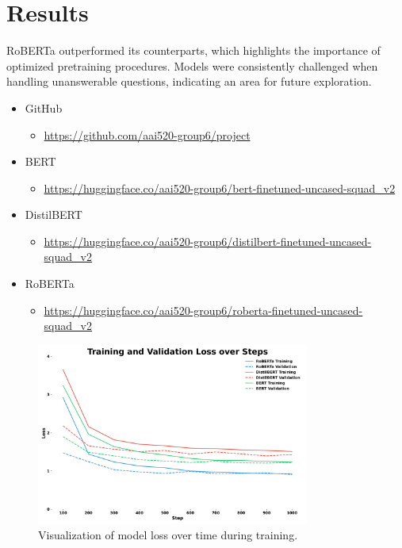 \documentclass[12pt]{extarticle}
\begin{document}
\section{Results}

RoBERTa outperformed its counterparts, which highlights the importance of optimized pretraining procedures. Models were consistently challenged when handling unanswerable questions, indicating an area for future exploration.

\begin{itemize}
    \item GitHub
    \begin{itemize}
        \item[] \href{https://github.com/aai520-group6/project}{https://github.com/aai520-group6/project}
    \end{itemize}
    \item BERT
    \begin{itemize}
        \item[] \href{https://huggingface.co/aai520-group6/bert-finetuned-uncased-squad_v2}{https://huggingface.co/aai520-group6/bert-finetuned-uncased-squad\_v2}
    \end{itemize}
    \item DistilBERT
    \begin{itemize}
        \item[] \href{https://huggingface.co/aai520-group6/distilbert-finetuned-uncased-squad_v2}{https://huggingface.co/aai520-group6/distilbert-finetuned-uncased-squad\_v2}
    \end{itemize}
    \item RoBERTa
    \begin{itemize}
        \item[] \href{https://huggingface.co/aai520-group6/roberta-finetuned-uncased-squad_v2}{https://huggingface.co/aai520-group6/roberta-finetuned-uncased-squad\_v2}
    \end{itemize}
\end{itemize}

\begin{figure}[h!]
    \centering
    \includegraphics[width=0.8\textwidth]{images/loss-over-time.png}
    \caption{Visualization of model loss over time during training.}
    \label{fig:loss}
    \end{figure}
\end{document}
